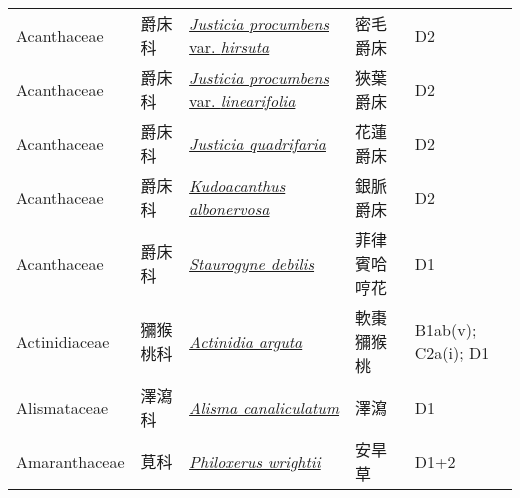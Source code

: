 {\begin{longtable}{L{2.5cm}L{2cm}L{5cm}L{2.5cm}L{3cm}}
    Acanthaceae & 爵床科 & \href{http://www.theplantlist.org/tpl1.1/search?q=Justicia+procumbens+var.+hirsuta}{\textit{Justicia procumbens} var. \textit{hirsuta} } & 密毛爵床 & D2    \\
    Acanthaceae & 爵床科 & \href{http://www.theplantlist.org/tpl1.1/search?q=Justicia+procumbens+var.+linearifolia}{\textit{Justicia procumbens} var. \textit{linearifolia} } & 狹葉爵床 & D2    \\
    Acanthaceae & 爵床科 & \href{http://www.theplantlist.org/tpl1.1/search?q=Justicia+quadrifaria}{\textit{Justicia quadrifaria} } & 花蓮爵床 & D2    \\
    Acanthaceae & 爵床科 & \href{http://www.theplantlist.org/tpl1.1/search?q=Kudoacanthus+albonervosa}{\textit{Kudoacanthus albonervosa} } & 銀脈爵床 & D2    \\
    Acanthaceae & 爵床科 & \href{http://www.theplantlist.org/tpl1.1/search?q=Staurogyne+debilis}{\textit{Staurogyne debilis} } & 菲律賓哈哼花 & D1    \\
    Actinidiaceae & 獼猴桃科 & \href{http://www.theplantlist.org/tpl1.1/search?q=Actinidia+arguta}{\textit{Actinidia arguta} } & 軟棗獼猴桃 & B1ab(v); C2a(i); D1    \\
    Alismataceae & 澤瀉科 & \href{http://www.theplantlist.org/tpl1.1/search?q=Alisma+canaliculatum}{\textit{Alisma canaliculatum} } & 澤瀉 & D1    \\
    Amaranthaceae & 莧科 & \href{http://www.theplantlist.org/tpl1.1/search?q=Philoxerus+wrightii}{\textit{Philoxerus wrightii} } & 安旱草 & D1+2    \\

\end{longtable}}
